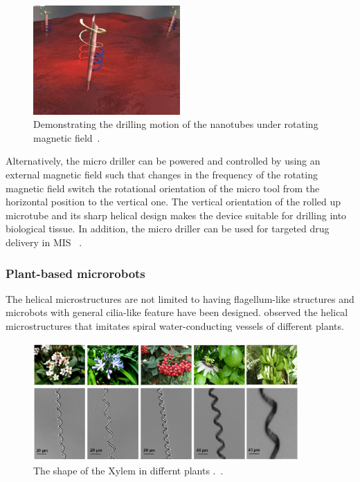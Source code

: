 \documentclass[12pt,a4paper,titlepage]{report}
\newcommand{\hilight}[1]{\colorbox{yellow}{#1}}
\begin{document}
\begin{figure}
  \begin{center}
    \includegraphics[width=0.5\textwidth]{nanoJet3}
  \caption{Demonstrating the drilling motion of the nanotubes under rotating
 magnetic field~\citep{C2NR32798H}.}
  \label{nanotube}
\end{center}
\end{figure}

Alternatively, the micro driller can be powered and controlled by using an external magnetic field 
such that changes in the frequency of the rotating magnetic field switch the rotational orientation of the 
micro tool from the horizontal position to the vertical one. The vertical orientation of the rolled up microtube 
and its sharp helical design makes the device suitable for drilling into biological tissue. In addition, the micro 
driller can be used for targeted drug delivery in MIS ~\citep{C2NR32798H}. 


\subsubsection{Plant-based microrobots}
The helical microstructures are not limited to having flagellum-like structures and microbots with
general cilia-like feature have been designed. \citeauthor{gao2013bioinspired}
 observed the helical microstructures that imitates spiral water-conducting vessels of different plants. 

\begin{figure}
  \centering
    \includegraphics[width=0.9\textwidth]{plants}
  \caption{The shape of the Xylem in differnt plants .~\citep{mahoney2011velocity}.}
  \label{plants}
\end{figure}
\end{document}
